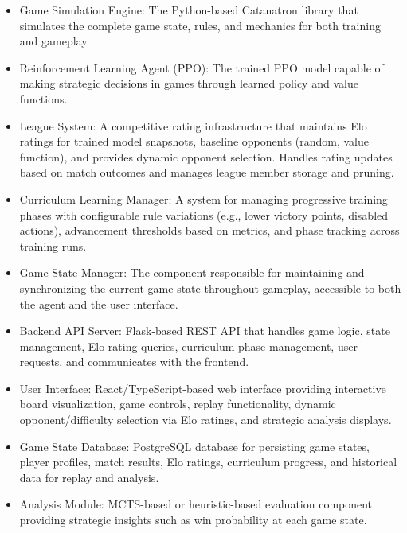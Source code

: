 \documentclass{article}
\begin{document}
\begin{itemize}
    \item Game Simulation Engine: The Python-based Catanatron library that simulates the complete game state, rules, and mechanics for both training and gameplay.

    \item Reinforcement Learning Agent (PPO): The trained PPO model capable of making strategic decisions in \emph{\Catan{}} games through learned policy and value functions.

    \item \Elo{} League System: A competitive rating infrastructure that maintains Elo ratings for trained model snapshots, baseline opponents (random, value function), and provides dynamic opponent selection. Handles rating updates based on match outcomes and manages league member storage and pruning.

    \item Curriculum Learning Manager: A system for managing progressive training phases with configurable rule variations (e.g., lower victory points, disabled actions), advancement thresholds based on metrics, and phase tracking across training runs.

    \item Game State Manager: The component responsible for maintaining and synchronizing the current game state throughout gameplay, accessible to both the \AI{} agent and the user interface.

    \item Backend API Server: Flask-based REST API that handles game logic, state management, Elo rating queries, curriculum phase management, user requests, and communicates with the frontend.

    \item User Interface: React/TypeScript-based web interface providing interactive board visualization, game controls, replay functionality, dynamic opponent/difficulty selection via Elo ratings, and strategic analysis displays.

    \item Game State Database: PostgreSQL database for persisting game states, player profiles, match results, Elo ratings, curriculum progress, and historical data for replay and analysis.

    \item Analysis Module: MCTS-based or heuristic-based evaluation component providing strategic insights such as win probability at each game state.


\end{itemize}
\end{document}
